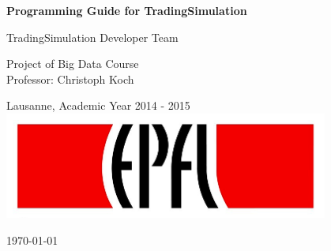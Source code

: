 \begin{titlepage}

  \begin{center}

    \vspace*{3\baselineskip}
    {\Large \bfseries Programming Guide for TradingSimulation \\[0.4cm] }

    \noindent
    TradingSimulation Developer Team \\[4cm]

    \begin{framed}
    Project of Big Data Course \\
    Professor: Christoph Koch \\
    \end{framed}

    \noindent
    Lausanne, Academic Year 2014 - 2015 \\[1cm]

    \includegraphics[width=0.8\textwidth]{img/epfl}~\\[1cm]

    \vfill

    {\large \today}

  \end{center}

\end{titlepage}

